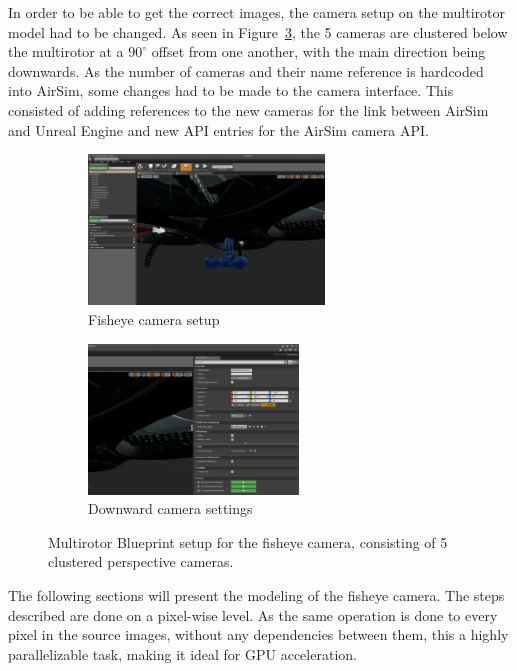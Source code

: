 In order to be able to get the correct images, the camera setup on the multirotor model had to be changed. As seen in Figure~\ref{fig:new_Blueprint_multirotor}, the 5 cameras are clustered below the multirotor at a $90^\circ$ offset from one another, with the main direction being downwards. As the number of cameras and their name reference is hardcoded into AirSim, some changes had to be made to the camera interface. This consisted of adding references to the new cameras for the link between AirSim and Unreal Engine and new API entries for the AirSim camera API.

\begin{figure}[!htb]
    \centering
    \begin{subfigure}{0.45\linewidth}
        \centering
        \includegraphics[height=4cm]{rapport/fig/Simulator/camera_setup.png}
        \caption{Fisheye camera setup}
        \label{fig:new_Blueprint_cameras}
    \end{subfigure}
    \begin{subfigure}{0.45\linewidth}
        \centering
        \includegraphics[height=4cm]{rapport/fig/Simulator/camera_setting.png}
        \caption{Downward camera settings}
        \label{fig:new_Blueprint_nodes}
    \end{subfigure}
    \caption{Multirotor Blueprint setup for the fisheye camera, consisting of 5 clustered perspective cameras.}
    \label{fig:new_Blueprint_multirotor}
\end{figure}

The following sections will present the modeling of the fisheye camera. The steps described are done on a pixel-wise level. As the same operation is done to every pixel in the source images, without any dependencies between them, this a highly parallelizable task, making it ideal for GPU acceleration.

